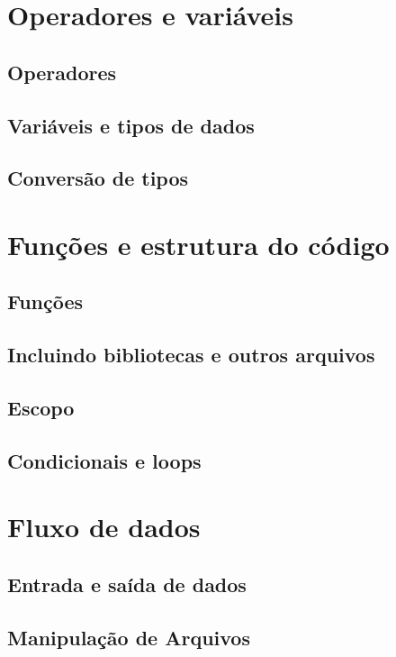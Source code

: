 \section{Operadores e variáveis}

\subsection{Operadores}


\subsection{Variáveis e tipos de dados}


\subsection{Conversão de tipos}


\section{Funções e estrutura do código}

\subsection{Funções}


\subsection{Incluindo bibliotecas e outros arquivos}


\subsection{Escopo}


\subsection{Condicionais e loops}


\section{Fluxo de dados}

\subsection{Entrada e saída de dados}


\subsection{Manipulação de Arquivos}

